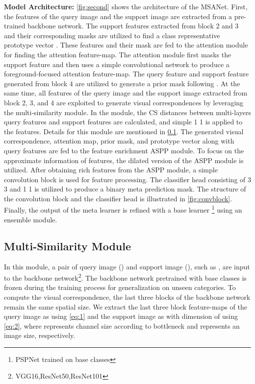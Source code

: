 \documentclass[10pt,twocolumn,letterpaper]{article}
\begin{document}
\textbf{Model Architecture:}
\cref{fig:second} shows the architecture of the MSANet. First, the features of the query image and the support image are extracted from a pre-trained backbone network. The support features extracted from block 2 and 3 and their corresponding masks are utilized to find a class representative prototype vector . These features and their mask are fed to the attention module for finding the attention feature-map. The attention module first masks the support feature and then uses a simple convolutional network to produce a foreground-focused attention feature-map. The query feature and support feature generated from block 4 are utilized to generate a prior mask  following \cite{FSS2PFE}. At the same time, all features of the query image and the support image extracted from block 2, 3, and 4 are exploited to generate visual correspondences by leveraging the multi-similarity module. In the module, the CS distances between multi-layers query features and support features are calculated, and simple 1  1  is applied to the features. Details for this module are mentioned in \cref{multi-similarity}. The generated visual correspondence, attention map, prior mask, and prototype vector along with query features are fed to the feature enrichment ASPP module. To focus on the approximate information of features, the dilated version of the ASPP module is utilized. After obtaining rich features from the ASPP module, a simple convolution block is used for feature processing. The classifier head consisting of 3  3  and 1  1  is utilized to produce a binary meta prediction mask. The structure of the convolution block and the classifier head is illustrated in \cref{fig:convblock}. Finally, the output of the meta learner is refined with a base learner \footnote{PSPNet trained on base classes} using an ensemble module.

\subsection{Multi-Similarity Module}\label{multi-similarity}
In this module, a pair of query image () and support image (), such as   , are input to the backbone network\footnote{VGG16,ResNet50,ResNet101}. The backbone network pretrained with base classes is frozen during the training process for generalization on unseen categories. To compute the visual correspondence, the last three blocks of the backbone network remain the same spatial size. We extract the last three block feature-maps of the query image as  using \cref{eq:1} and the support image as  with dimension of  using \cref{eq:2}, where  represents channel size according to bottleneck  and  represents an image size, respectively. 
\end{document}
